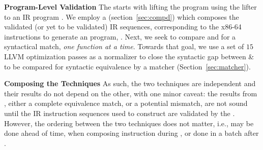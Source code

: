 \textbf{Program-Level Validation} The \plv starts with lifting the \ISA
program  using the lifter  to an IR program .
%
We employ a \compd (section~\ref{sec:compd}) which composes the validated (or
yet to be validated) IR sequences, corresponding to the x86-64 instructions to
generate an \LLVM program, .
%
Next, we seek to compare  and  for a syntactical match,
\emph{one function at a time}. Towards that goal, we use a set of $15$ LLVM
optimization passes as a normalizer to close the syntactic gap between 
\&  to be compared for syntactic equivalence by a matcher
(Section~\ref{sec:matcher}). 

\textbf{Composing the Techniques} As such, the two techniques are
independent and their results do not depend on the other, with one minor
caveat: the results from \plv, either a complete equivalence match, or a
potential mismatch, are not sound until the IR instruction sequences used to construct
 are validated by the \siv. However, the ordering between the two
techniques does not matter, i.e., \siv may be done ahead of time, when
composing instruction during \plv, or done in a batch after \plv.


